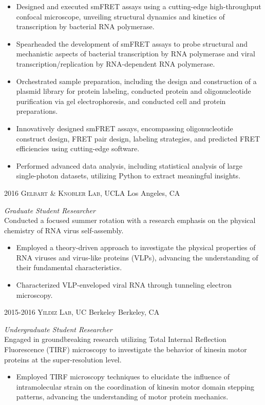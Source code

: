 \begin{entrylist}
{\begin{itemize}
\item Designed and executed smFRET assays using a cutting-edge high-throughput confocal microscope, unveiling structural dynamics and kinetics of transcription by bacterial RNA polymerase.
\item Spearheaded the development of smFRET assays to probe structural and mechanistic aspects of bacterial transcription by RNA polymerase and viral transcription/replication by RNA-dependent RNA polymerase.
\item Orchestrated sample preparation, including the design and construction of a plasmid library for protein labeling, conducted protein and oligonucleotide purification via gel electrophoresis, and conducted cell and protein preparations.
\item Innovatively designed smFRET assays, encompassing oligonucleotide construct design, FRET pair design, labeling strategies, and predicted FRET efficiencies using cutting-edge software.
\item Performed advanced data analysis, including statistical analysis of large single-photon datasets, utilizing Python to extract meaningful insights.
\end{itemize}}
\entry
{2016}
{\textsc{Gelbart \& Knobler Lab}, UCLA}
{Los Angeles, CA}
{\emph{Graduate Student Researcher}\\
Conducted a focused summer rotation with a research emphasis on the physical chemistry of RNA virus self-assembly.
\begin{itemize}
\item Employed a theory-driven approach to investigate the physical properties of RNA viruses and virus-like proteins (VLPs), advancing the understanding of their fundamental characteristics.
\item Characterized VLP-enveloped viral RNA through tunneling electron microscopy.
\end{itemize}}
\entry
{2015-2016}
{\textsc{Yildiz Lab}, UC Berkeley}
{Berkeley, CA}
{\emph{Undergraduate Student Researcher}\\
Engaged in groundbreaking research utilizing Total Internal Reflection Fluorescence (TIRF) microscopy to investigate the behavior of kinesin motor proteins at the super-resolution level.
\begin{itemize}
\item Employed TIRF microscopy techniques to elucidate the influence of intramolecular strain on the coordination of kinesin motor domain stepping patterns, advancing the understanding of motor protein mechanics.

\end{itemize}}
\end{entrylist}
